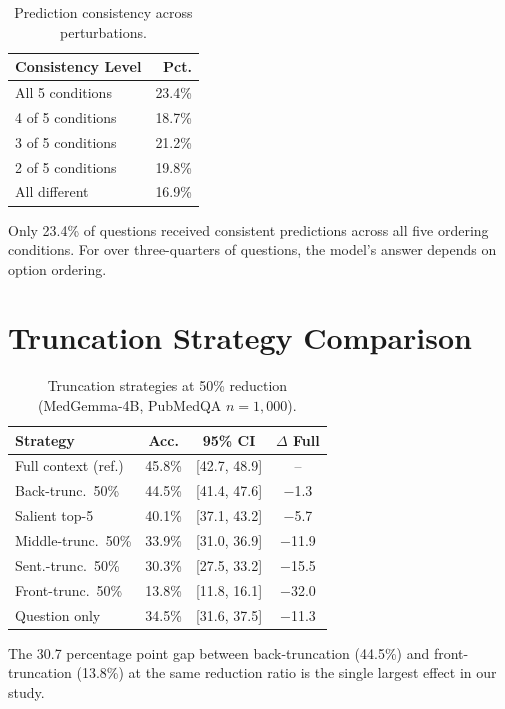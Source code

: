 \documentclass[runningheads,a4paper]{llncs}
\begin{document}
\begin{table}[t]
\centering
\caption{Prediction consistency across perturbations.}
\label{tab:consistency}
\begin{tabular}{lr}
\toprule
\textbf{Consistency Level} & \textbf{Pct.} \\
\midrule
All 5 conditions & 23.4\% \\
4 of 5 conditions & 18.7\% \\
3 of 5 conditions & 21.2\% \\
2 of 5 conditions & 19.8\% \\
All different & 16.9\% \\
\bottomrule
\end{tabular}
\end{table}

Only 23.4\% of questions received consistent predictions across all five ordering conditions. For over three-quarters of questions, the model's answer depends on option ordering.

\section{Truncation Strategy Comparison}\label{app:trunc}

\begin{table}[t]
\centering
\caption{Truncation strategies at 50\% reduction (MedGemma-4B, PubMedQA $n{=}1{,}000$).}
\label{tab:trunc_comparison}
\begin{tabular}{lccc}
\toprule
\textbf{Strategy} & \textbf{Acc.} & \textbf{95\% CI} & \textbf{$\Delta$ Full} \\
\midrule
Full context (ref.) & 45.8\% & [42.7, 48.9] & -- \\
\midrule
Back-trunc.\ 50\% & 44.5\% & [41.4, 47.6] & $-$1.3 \\
Salient top-5 & 40.1\% & [37.1, 43.2] & $-$5.7 \\
Middle-trunc.\ 50\% & 33.9\% & [31.0, 36.9] & $-$11.9 \\
Sent.-trunc.\ 50\% & 30.3\% & [27.5, 33.2] & $-$15.5 \\
Front-trunc.\ 50\% & 13.8\% & [11.8, 16.1] & $-$32.0 \\
\midrule
Question only & 34.5\% & [31.6, 37.5] & $-$11.3 \\
\bottomrule
\end{tabular}
\end{table}

The 30.7 percentage point gap between back-truncation (44.5\%) and front-truncation (13.8\%) at the same reduction ratio is the single largest effect in our study.
\end{document}
